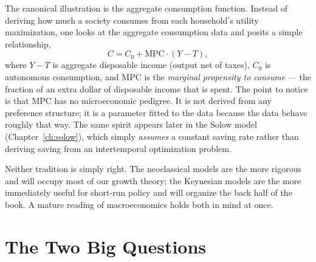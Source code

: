 The canonical illustration is the aggregate consumption function. Instead of deriving how much a society consumes from each household's utility maximization, one looks at the aggregate consumption data and posits a simple relationship,
\[
C = C_0 + \mathrm{MPC}\cdot(Y - T),
\]
where $Y - T$ is aggregate disposable income (output net of taxes), $C_0$ is autonomous consumption, and $\mathrm{MPC}$ is the \emph{marginal propensity to consume} --- the fraction of an extra dollar of disposable income that is spent. The point to notice is that $\mathrm{MPC}$ has no microeconomic pedigree. It is not derived from any preference structure; it is a parameter fitted to the data because the data behave roughly that way. The same spirit appears later in the Solow model (Chapter~\ref{ch:solow}), which simply \emph{assumes} a constant saving rate rather than deriving saving from an intertemporal optimization problem.


Neither tradition is simply right. The neoclassical models are the more rigorous and will occupy most of our growth theory; the Keynesian models are the more immediately useful for short-run policy and will organize the back half of the book. A mature reading of macroeconomics holds both in mind at once.


\section{The Two Big Questions}

